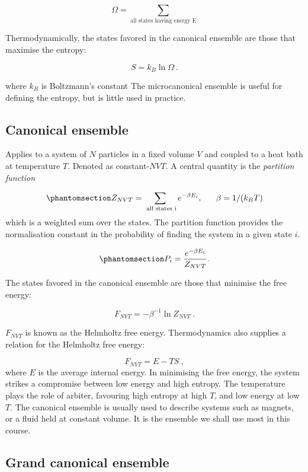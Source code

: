 \documentclass[
  letterpaper,
  DIV=11,
  numbers=noendperiod]{scrreprt}
\begin{document}
\[
\Omega=\sum_\textrm{all states having energy E}
\]

Thermodynamically, the states favored in the canonical ensemble are
those that maximise the entropy:

\[
S=k_B\ln \Omega\: .
\]

where \(k_B\) is Boltzmann's constant The microcanonical ensemble is
useful for defining the entropy, but is little used in practice.

\subsection*{Canonical ensemble}\label{sec-canonical}

Applies to a system of \(N\) particles in a fixed volume \(V\) and
coupled to a heat bath at temperature \(T\). Denoted as
constant-\(NVT\). A central quantity is the \emph{partition function}

\begin{equation}\phantomsection\label{eq-ZNVT}{
Z_{NVT}=\sum_\textrm{ all states i}e^{-\beta E_i},~~~~~\beta=1/(k_BT)
}\end{equation} which is a weighted sum over the states. The partition
function provides the normalisation constant in the probability of
finding the system in a given state \(i\).

\begin{equation}\phantomsection\label{eq-Pi}{
P_i=\frac{e^{-\beta E_i}}{Z_{NVT}}.
}\end{equation}

The states favored in the canonical ensemble are those that minimise the
free energy:

\[
F_{NVT}=-\beta^{-1}\ln Z_{NVT}\:.
\]

\(F_{NVT}\) is known as the Helmholtz free energy. Thermodynamics also
supplies a relation for the Helmholtz free energy:

\[
F_{NVT}=E-TS\:,
\] where \(E\) is the average internal energy. In minimising the free
energy, the system strikes a compromise between low energy and high
entropy. The temperature plays the role of arbiter, favouring high
entropy at high \(T\), and low energy at low \(T\). The canonical
ensemble is usually used to describe systems such as magnets, or a fluid
held at constant volume. It is the ensemble we shall use most in this
course.

\subsection*{Grand canonical ensemble}\label{sec-grandcanonical}
\end{document}
